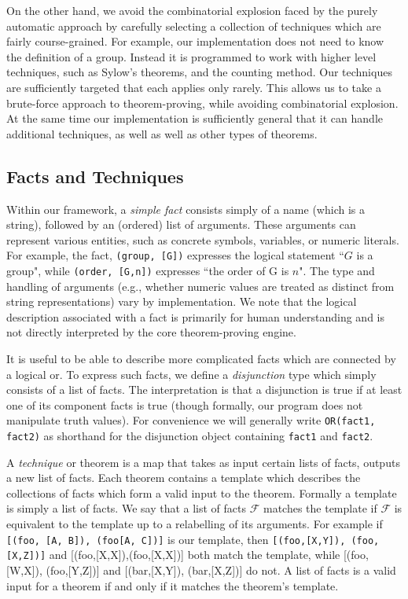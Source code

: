 \documentclass[11pt,
oneside]{article} %
\begin{document}
On the other hand, we avoid the combinatorial explosion faced by the
purely automatic approach by carefully selecting a collection of
techniques which are fairly course-grained.  For example, our
implementation does not need to know the definition of a group.
Instead it is programmed to work with higher level techniques, such as
Sylow's theorems, and the counting method.  Our techniques are
sufficiently targeted that each applies only rarely.  This allows us
to take a brute-force approach to theorem-proving, while avoiding
combinatorial explosion.  At the same time our implementation is
sufficiently general that it can handle additional techniques, as well
as well as other types of theorems.

\subsection{Facts and Techniques}

Within our framework, a \textit{simple fact} consists simply of a name
(which is a string), followed by an (ordered) list of arguments. These
arguments can represent various entities, such as concrete symbols,
variables, or numeric literals. For example, the fact,
\texttt{(group, [G])} expresses the logical statement ``$G$ is a group",
while \texttt{(order, [G,n])} expresses ``the order of G is $n$".
The type and handling of arguments (e.g., whether numeric values are
treated as distinct from string representations) vary by implementation.
We note that the logical description associated with a fact is primarily
for human understanding and is not directly interpreted by the core
theorem-proving engine.

It is useful to be able to describe more complicated facts which are
connected by a logical or.  To express such facts, we define a
\textit{disjunction} type which simply consists of a list of facts.
The interpretation is that a disjunction is true if at least one of
its component facts is true (though formally, our program does not
manipulate truth values).  For convenience we will generally write
\texttt{OR(fact1, fact2)} as shorthand for the disjunction object
containing \texttt{fact1} and \texttt{fact2}.

A \textit{technique} or theorem is a map that takes as input certain
lists of facts, outputs a new list of facts.  Each theorem contains a
template which describes the collections of facts which form a valid
input to the theorem.  Formally a template is simply a list of facts.
We say that a list of facts $\mathcal{F}$ matches the template if
$\mathcal{F}$ is equivalent to the template up to a relabelling of its
arguments.  For example if \texttt{[(foo, [A, B]), (foo[A, C])]} is
our template, then \texttt{[(foo,[X,Y]), (foo,[X,Z])]} and
[(foo,[X,X]),(foo,[X,X])] both match the template, while [(foo,[W,X]),
(foo,[Y,Z])] and [(bar,[X,Y]), (bar,[X,Z])] do not.  A list of facts
is a valid input for a theorem if and only if it matches the theorem's
template.
\end{document}
